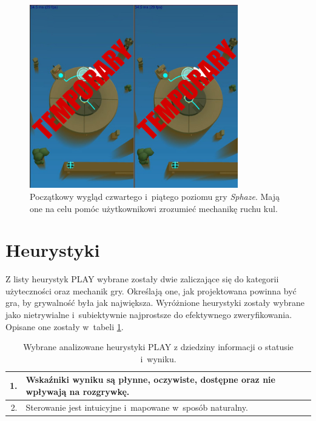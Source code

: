 \documentclass[a4paper,12pt,numbers=noenddot]{report}
\begin{document}
\begin{figure}[h!]
	\centering
  	\includegraphics[height=8cm]{fig/tmp2.jpg}
	\caption{Początkowy wygląd czwartego i~piątego poziomu gry \textit{Sphaze}. Mają one na celu pomóc użytkownikowi zrozumieć mechanikę ruchu kul.}
	\label{fig:tut_L3_2}
\end{figure}

\section{Heurystyki}
Z listy heurystyk PLAY \cite{ArticlePLAY} wybrane zostały dwie zaliczające się do kategorii użyteczności oraz mechanik gry. Określają one, jak projektowana powinna być gra, by grywalność była jak największa. Wyróżnione heurystyki zostały wybrane jako nietrywialne i~subiektywnie najprostsze do efektywnego zweryfikowania. Opisane one zostały w~tabeli \ref{tab:tab1}.

\begin{table}[h!]
  \centering
  \caption{Wybrane analizowane heurystyki PLAY z dziedziny informacji o statusie i~wyniku.}
  \label{tab:tab1}
  \begin{tabular}{|r|l|}
    \hline
    1. & Wskaźniki wyniku są płynne, oczywiste, dostępne oraz nie wpływają na rozgrywkę.\\
    \hline
    2. & Sterowanie jest intuicyjne i~mapowane w~sposób naturalny.\\
    \hline
  \end{tabular}
\end{table}
\end{document}
